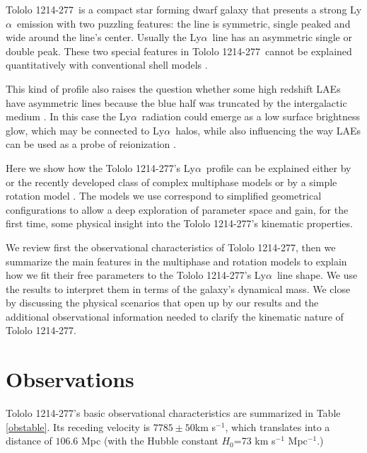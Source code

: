 \documentclass[a4,useAMS,usenatbib,usegraphicx]{mn2e}
\newcommand{\tol}{Tololo 1214-277}
\newcommand{\lya}{Ly$\alpha$}
\begin{document}
\tol\ is a compact star forming dwarf galaxy that presents a
strong \lya\ emission \citep{Thuan97} with two puzzling 
features: the line is symmetric, single peaked and wide around the
line's center.
Usually the \lya\ line has an asymmetric single or double peak. 
These two special features in \tol\ cannot be explained quantitatively
with conventional shell models
\citep{Mas-Hesse09,2015A&A...578A...7V,2015ApJ...812..123G}.   

This kind of profile also raises the question whether some high redshift
LAEs have asymmetric lines because the blue half was truncated by the
intergalactic medium \citep{2007MNRAS.377.1175D}. 
In this case the \lya\ radiation could emerge as a low surface
brightness glow, which may be connected to \lya\ halos, while also
influencing the way LAEs can be used as a probe of reionization
\citep{2014PASA...31...40D}.

Here we show how the \tol's \lya\ profile can be explained
either by  or the recently developed class of complex multiphase models 
\citep{Gronke2016} or by a simple rotation model
\citep{GaravitoCamargo2014}. 
The models we use correspond to simplified geometrical configurations
to allow a deep exploration of parameter space and gain, for the first time,
some physical insight into the \tol's kinematic properties.

We review first the observational characteristics of
\tol, then we summarize the main features in the multiphase and
rotation models to explain how we fit their free parameters 
to the \tol's \lya\ line shape.
We use the results to interpret them in terms of the galaxy's
dynamical mass. 
We close by discussing the physical scenarios that open up by our
results and the additional observational information needed to clarify
the kinematic nature of \tol.


\section{Observations}
\tol's basic observational characteristics are summarized in Table \ref{obstable}.
Its receding velocity is $7785\pm 50$km s$^{-1}$, which translates
into a distance of $106.6$ Mpc (with the Hubble constant $H_{0}$=73
km s$^{-1}$ Mpc$^{-1}$.) 
\end{document}
